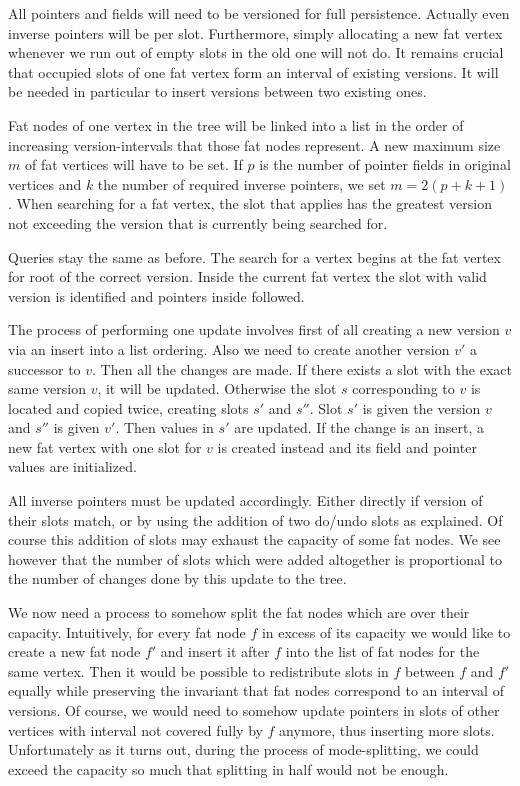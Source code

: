 All pointers and fields will need to be versioned for full persistence. Actually even inverse pointers will be per slot. Furthermore, simply allocating a new fat vertex whenever we run out of empty slots in the old one will not do. It remains crucial that occupied slots of one fat vertex form an interval of existing versions. It will be needed in particular to insert versions between two existing ones.

Fat nodes of one vertex in the tree will be linked into a list in the order of increasing version-intervals that those fat nodes represent. A new maximum size~$m$ of fat vertices will have to be set. If $p$ is the number of pointer fields in original vertices and $k$ the number of required inverse pointers, we set $m = 2(p+k+1)$.
When searching for a fat vertex, the slot that applies has the greatest version not exceeding the version that is currently being searched for.

Queries stay the same as before. The search for a vertex begins at the fat vertex for root of the correct version. Inside the current fat vertex the slot with valid version is identified and pointers inside followed.

The process of performing one update involves first of all creating a new version $v$ via an insert into a list ordering. Also we need to create another version $v'$ a successor to $v$. Then all the changes are made. If there exists a slot with the exact same version $v$, it will be updated. Otherwise the slot $s$ corresponding to $v$ is located and copied twice, creating slots $s'$ and $s''$. Slot $s'$ is given the version $v$ and $s''$ is given $v'$. Then values in $s'$ are updated.
If the change is an insert, a new fat vertex with one slot for $v$ is created instead and its field and pointer values are initialized.

All inverse pointers must be updated accordingly. Either directly if version of their slots match, or by using the addition of two do/undo slots as explained. Of course this addition of slots may exhaust the capacity of some fat nodes. We see however that the number of slots which were added altogether is proportional to the number of changes done by this update to the tree. 

We now need a process to somehow split the fat nodes which are over their capacity. 
Intuitively, for every fat node $f$ in excess of its capacity we would like to create a new fat node $f'$ and insert it after $f$ into the list of fat nodes for the same vertex. 
Then it would be possible to redistribute slots in $f$ between $f$ and $f'$ equally while preserving the invariant that fat nodes correspond to an interval of versions.
Of course, we would need to somehow update pointers in slots of other vertices with interval not covered fully by $f$ anymore, thus inserting more slots.
Unfortunately as it turns out, during the process of mode-splitting, we could exceed the capacity so much that splitting in half would not be enough. 

